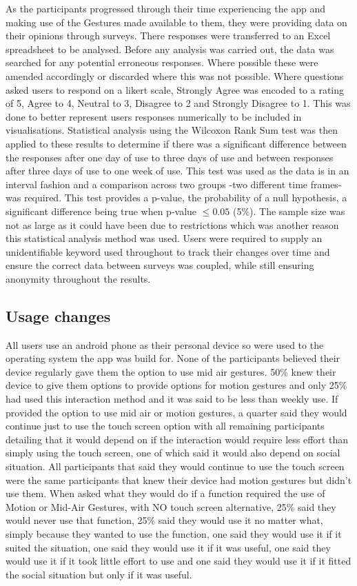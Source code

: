 \documentclass{l4proj}
\begin{document}
As the participants progressed through their time experiencing the app and making use of the Gestures made available to them, they were providing data on their opinions through surveys. There responses were transferred to an Excel spreadsheet to be analysed. Before any analysis was carried out, the data was searched for any potential erroneous responses. Where possible these were amended accordingly or discarded where this was not possible. Where questions asked users to respond on a likert scale, Strongly Agree was encoded to a rating of 5, Agree to 4, Neutral to 3, Disagree to 2 and Strongly Disagree to 1. This was done to better represent users responses numerically to be included in visualisations. Statistical analysis using the Wilcoxon Rank Sum test was then applied to these results to determine if there was a significant difference between the responses after one day of use to three days of use and between responses after three days of use to one week of use. This test was used as the data is in an interval fashion and a comparison across two groups -two different time frames- was required. This test provides a p-value, the probability of a null hypothesis, a significant difference being true when p-value $\leq{0.05}$ (5\%). The sample size was not as large as it could have been due to restrictions which was another reason this statistical analysis method was used. Users were required to supply an unidentifiable keyword used throughout to track their changes over time and ensure the correct data between surveys was coupled, while still ensuring anonymity throughout the results. 

\subsection{Usage changes}
All users use an android phone as their personal device so were used to the operating system the app was build for. None of the participants believed their device regularly gave them the option to use mid air gestures. 50\% knew their device to give them options to provide options for motion gestures and only 25\% had used this interaction method and it was said to be less than weekly use. If provided the option to use mid air or motion gestures, a quarter said they would continue just to use the touch screen option with all remaining participants detailing that it would depend on if the interaction would require less effort than simply using the touch screen, one of which said it would also depend on social situation. All participants that said they would continue to use the touch screen were the same participants that knew their device had motion gestures but didn't use them. When asked what they would do if a function required the use of Motion or Mid-Air Gestures, with NO touch screen alternative, 25\% said they would never use that function, 25\% said they would use it no matter what, simply because they wanted to use the function, one said they would use it if it suited the situation, one said they would use it if it was useful, one said they would use it if it took little effort to use and one said they would use it if it fitted the social situation but only if it was useful.
\end{document}
